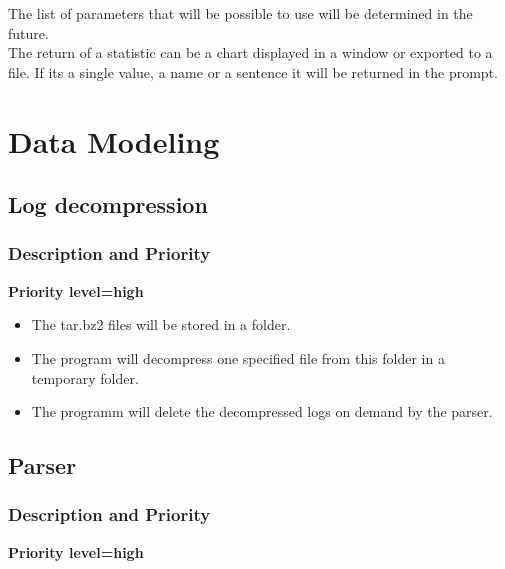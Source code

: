 \documentclass{scrreprt}
\begin{document}
The list of parameters that will be possible to use will be determined in the
future.\\
The return of a statistic can be a chart displayed in a window or exported to a
file. If its a single value, a name or a sentence it will be returned in the prompt.
\section{Data Modeling}

\subsection{Log decompression}
\subsubsection{Description and Priority}
\textbf{Priority level=high}\\


\begin{itemize}
  \item The tar.bz2 files will be stored in a folder.
  \item The program will decompress one specified file from this folder in a temporary folder.
  \item The programm will delete the decompressed logs on demand by the parser.
\end{itemize}

\subsection{Parser}

\subsubsection{Description and Priority}

\textbf{Priority level=high}\\
\end{document}
